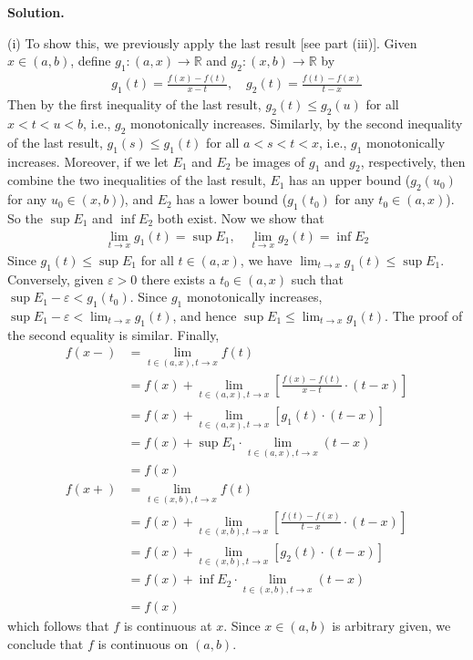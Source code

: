\documentclass[12pt]{article}
\theoremstyle{definition}
\begin{document}
\smallskip
\noindent\textbf{Solution.}\quad

(i) To show this, we previously apply the last result [see part (iii)]. Given $x\in(a,b)$, define $g_1:(a,x)\to \mathbb{R}$ and $g_2:(x,b)\to \mathbb{R}$ by
\begin{align*}
g_1(t)=\frac{f(x)-f(t)}{x-t},\quad g_2(t)=\frac{f(t)-f(x)}{t-x}
\end{align*}
Then by the first inequality of the last result, $g_2(t)\le g_2(u)$ for all $x<t<u<b$, i.e., $g_2$ monotonically increases. Similarly, by the second inequality of the last result, $g_1(s)\le g_1(t)$ for all $a<s<t<x$, i.e., $g_1$ monotonically increases. Moreover, if we let $E_1$ and $E_2$ be images of $g_1$ and $g_2$, respectively, then combine the two inequalities of the last result, $E_1$ has an upper bound ($g_2(u_0)$ for any $u_0\in(x,b)$), and $E_2$ has a lower bound ($g_1(t_0)$ for any $t_0\in(a,x)$). So the $\sup E_1$ and $\inf E_2$ both exist. Now we show that
\begin{align*}
\lim_{t\to x}g_1(t)=\sup E_1,\quad \lim_{t\to x}g_2(t)=\inf E_2
\end{align*}
Since $g_1(t)\le\sup E_1$ for all $t\in(a,x)$, we have $\lim_{t\to x}g_1(t)\le\sup E_1$. Conversely, given $\varepsilon>0$ there exists a $t_0\in(a,x)$ such that $\sup E_1-\varepsilon<g_1(t_0)$. Since $g_1$ monotonically increases, $\sup E_1-\varepsilon<\lim_{t\to x}g_1(t)$, and hence $\sup E_1\le\lim_{t\to x}g_1(t)$. The proof of the second equality is similar. Finally,
\begin{align*}
f(x-)
&=\lim_{t\in(a,x),t\to x}f(t) \\
&=f(x)+\lim_{t\in(a,x),t\to x}\left[\frac{f(x)-f(t)}{x-t}\cdot(t-x)\right] \\
&=f(x)+\lim_{t\in(a,x),t\to x}\left[g_1(t)\cdot(t-x)\right] \\
&=f(x)+\sup E_1\cdot\lim_{t\in(a,x),t\to x}(t-x) \\
&=f(x) \\
f(x+)
&=\lim_{t\in(x,b),t\to x}f(t) \\
&=f(x)+\lim_{t\in(x,b),t\to x}\left[\frac{f(t)-f(x)}{t-x}\cdot(t-x)\right] \\
&=f(x)+\lim_{t\in(x,b),t\to x}\left[g_2(t)\cdot(t-x)\right] \\
&=f(x)+\inf E_2\cdot\lim_{t\in(x,b),t\to x}(t-x) \\
&=f(x)
\end{align*}
which follows that $f$ is continuous at $x$. Since $x\in(a,b)$ is arbitrary given, we conclude that $f$ is continuous on $(a,b)$.
\end{document}
